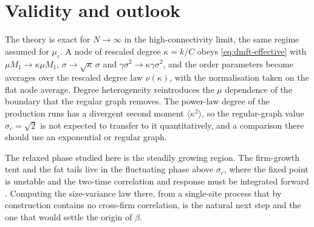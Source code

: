 \section{Validity and outlook}
\label{sec:dmft-outlook}

The theory is exact for $N\to\infty$ in the high-connectivity limit, the same regime
assumed for $\mu_c$. A node of rescaled degree $\kappa = k/C$ obeys
\eqref{eq:dmft-effective} with $\mu M_1 \to \kappa\mu M_1$, $\sigma \to \sqrt\kappa\,\sigma$
and $\gamma\sigma^2 \to \kappa\gamma\sigma^2$, and the order parameters become averages over
the rescaled degree law $\nu(\kappa)$, with the normalisation taken on the flat node
average. Degree heterogeneity reintroduces the $\mu$ dependence of the boundary that the
regular graph removes. The power-law degree of the production runs has a divergent second
moment $\langle\kappa^2\rangle$, so the regular-graph value $\sigma_c = \sqrt2$ is not
expected to transfer to it quantitatively, and a comparison there should use an exponential
or regular graph.

The relaxed phase studied here is the steadily growing region. The firm-growth tent and the
fat tails live in the fluctuating phase above $\sigma_c$, where the fixed point is unstable
and the two-time correlation and response must be integrated forward
\citep{roy2020,diederich1989}. Computing the size-variance law there, from a single-site
process that by construction contains no cross-firm correlation, is the natural next step
and the one that would settle the origin of $\beta$.

\printbibliography


